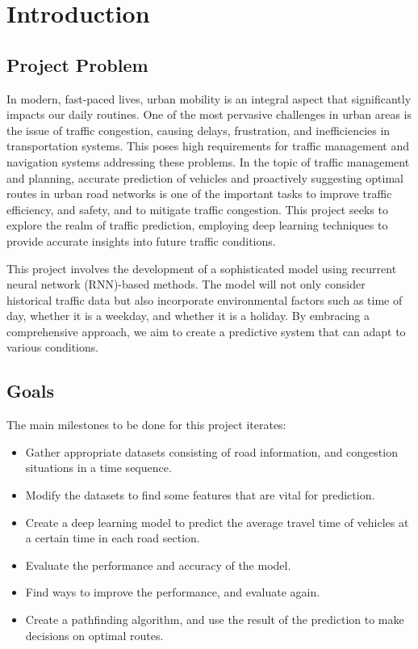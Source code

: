 \chapter{Introduction} \label{Chapter:Introduction}

\section{Project Problem}

In modern, fast-paced lives, urban mobility is an integral aspect that significantly impacts our daily routines. 
One of the most pervasive challenges in urban areas is the issue of traffic congestion, causing delays, frustration, and inefficiencies in transportation systems. 
This poses high requirements for traffic management and navigation systems addressing these problems. 
In the topic of traffic management and planning, accurate prediction of vehicles and proactively suggesting optimal routes in urban road networks is one of the important tasks to improve traffic efficiency, and safety, and to mitigate traffic congestion. 
This project seeks to explore the realm of traffic prediction, employing deep learning techniques to provide accurate insights into future traffic conditions. 

This project involves the development of a sophisticated model using recurrent neural network (RNN)-based methods. 
The model will not only consider historical traffic data but also incorporate environmental factors such as time of day, 
whether it is a weekday, and whether it is a holiday. By embracing a comprehensive approach, we aim to create a predictive system that can adapt to various conditions.

\section{Goals}

The main milestones to be done for this project iterates:

\begin{itemize}
    \item Gather appropriate datasets consisting of road information, and congestion situations in a time sequence. 
    \item Modify the datasets to find some features that are vital for prediction. 
    \item Create a deep learning model to predict the average travel time of vehicles at a certain time in each road section.
    \item Evaluate the performance and accuracy of the model.
    \item Find ways to improve the performance, and evaluate again.
    \item Create a pathfinding algorithm, and use the result of the prediction to make decisions on optimal routes. 
\end{itemize}